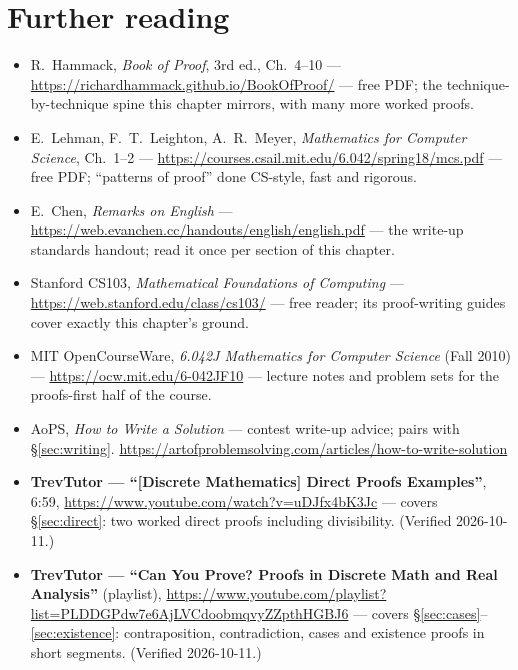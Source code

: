 \section*{Further reading}
\begin{itemize}
\item R.~Hammack, \emph{Book of Proof}, 3rd ed., Ch.~4--10 ---
\url{https://richardhammack.github.io/BookOfProof/} --- free PDF; the
technique-by-technique spine this chapter mirrors, with many more worked
proofs.
\item E.~Lehman, F.~T.~Leighton, A.~R.~Meyer, \emph{Mathematics for Computer
Science}, Ch.~1--2 ---
\url{https://courses.csail.mit.edu/6.042/spring18/mcs.pdf} --- free PDF;
``patterns of proof'' done CS-style, fast and rigorous.
\item E.~Chen, \emph{Remarks on English} ---
\url{https://web.evanchen.cc/handouts/english/english.pdf} --- the
write-up standards handout; read it once per section of this chapter.
\item Stanford CS103, \emph{Mathematical Foundations of Computing} ---
\url{https://web.stanford.edu/class/cs103/} --- free reader; its
proof-writing guides cover exactly this chapter's ground.
\item MIT OpenCourseWare, \emph{6.042J Mathematics for Computer Science}
(Fall 2010) --- \url{https://ocw.mit.edu/6-042JF10} --- lecture notes and
problem sets for the proofs-first half of the course.
\item AoPS, \emph{How to Write a Solution} --- contest write-up advice;
pairs with \S\ref{sec:writing}.
\url{https://artofproblemsolving.com/articles/how-to-write-solution}
\end{itemize}

\begin{rulebox}
\begin{itemize}
\item \textbf{TrevTutor --- ``[Discrete Mathematics] Direct Proofs
Examples''}, 6:59, \url{https://www.youtube.com/watch?v=uDJfx4bK3Jc} ---
covers \S\ref{sec:direct}: two worked direct proofs including divisibility.
(Verified 2026-10-11.)
\item \textbf{TrevTutor --- ``Can You Prove? Proofs in Discrete Math and
Real Analysis''} (playlist),
\url{https://www.youtube.com/playlist?list=PLDDGPdw7e6AjLVCdoobmqvyZZpthHGBJ6}
--- covers \S\ref{sec:cases}--\ref{sec:existence}: contraposition,
contradiction, cases and existence proofs in short segments.
(Verified 2026-10-11.)
\end{itemize}
\end{rulebox}


